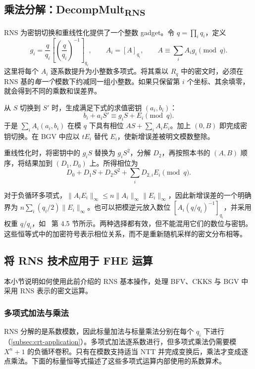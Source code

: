 \subsection{乘法分解：\textsf{DecompMult\textsubscript{RNS}}}
\label{subsec:rns-decompmult}

RNS 为密钥切换和重线性化提供了一个整数 gadget。令 $q=\prod_iq_i$，定义
\[
g_i=\frac q{q_i}\left[\left(\frac q{q_i}\right)^{-1}\right]_{q_i},\qquad
A_i=[A]_{q_i},\qquad A\equiv\sum_iA_ig_i\pmod q.
\]
这里将每个 $A_i$ 逐系数提升为小整数多项式。将其乘以 $R_q$ 中的密文时，必须在 RNS 基的\emph{每一个}模数下约减同一组小整数。如果只保留第 $i$ 个坐标、其余填零，就会得到不同的乘数和误差界。

\begin{tcolorbox}[title={\textbf{\tboxlabel{\ref*{subsec:rns-decompmult}} \textsf{DecompMult\textsubscript{RNS}}}}]
从 $S$ 切换到 $S'$ 时，生成满足下式的求值密钥 $(a_i,b_i)$：
\[
b_i+a_iS'\equiv g_iS+E_i\pmod q.
\]
于是 $\sum_iA_i(a_i,b_i)$ 在模 $q$ 下具有相位 $AS+\sum_iA_iE_i$。加上 $(0,B)$ 即完成密钥切换。在 BGV 中应以 $tE_i$ 替代 $E_i$，使新增误差被明文模数整除。

重线性化时，将密钥中的 $g_iS$ 替换为 $g_iS^2$，分解 $D_2$，再按照本书的 $(A,B)$ 顺序，将结果加到 $(D_1,D_0)$ 上。所得相位为
\[
D_0+D_1S+D_2S^2+\sum_iD_{2,i}E_i\pmod q.
\]
\end{tcolorbox}

对于负循环多项式，$\|A_iE_i\|_\infty\leq n\|A_i\|_\infty\|E_i\|_\infty$，因此新增误差的一个明确界为 $n\sum_i(q_i/2)\|E_i\|_\infty$。也可以把模逆元放入数位 $[A_i(q/q_i)^{-1}]_{q_i}$，并采用权重 $q/q_i$，如~\cite{rns-bfv} 第 4.5 节所示。两种选择都有效，但不能混用它们的数位与密钥。这些恒等式中的加密符号表示相位关系，而不是重新随机采样的密文分布相等。


\subsection{将 RNS 技术应用于 FHE 运算}
\label{subsec:rns-application}

本小节说明如何使用此前介绍的 RNS 基本操作，处理 BFV、CKKS 与 BGV 中采用 RNS 表示的密文运算。


\subsubsection{多项式加法与乘法}
\label{subsubsec:rns-application-basic}

RNS 分解的是系数模数，因此标量加法与标量乘法分别在每个 $q_i$ 下进行（\autoref{subsec:crt-application}）。多项式加法逐系数进行，但多项式乘法仍需要模 $X^n+1$ 的负循环卷积。只有在模数支持适当 NTT 并完成变换后，乘法才变成逐点乘法。下面的标量恒等式描述了这些多项式运算内部使用的系数算术。

